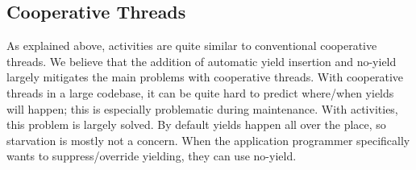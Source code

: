 \documentclass[pldi,10pt,preprint]{sigplanconf-pldi16}
\begin{document}







\subsection{Cooperative Threads}

As explained above, activities are quite similar to conventional cooperative threads.
We believe that the addition of automatic yield insertion and no-yield largely mitigates the main problems with cooperative threads.
With cooperative threads in a large codebase, it can be quite hard to predict where/when yields will happen; this is especially problematic during maintenance.
With activities, this problem is largely solved.
By default yields happen all over the place, so starvation is mostly not a concern.
When the application programmer specifically wants to suppress/override yielding, they can use no-yield.
\end{document}
